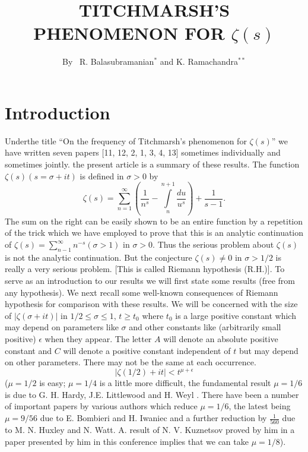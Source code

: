 
\title{TITCHMARSH'S PHENOMENON FOR $\zeta (s)$}

\author{By~ R. Balasubramanian$^\ast$ and K. Ramachandra$^{\ast\ast}$}

\date{}
\maketitle

\setcounter{pageoriginal}{12} 

\section{Introduction}\label{art2-sec1}
Under\pageoriginale  the title ``On the frequency of Titchmarsh's phenomenon for $\zeta(s)$'' we have written seven papers [11, 12, 2, 1, 3, 4, 13] sometimes individually and sometimes jointly. the present article is a summary of these results. The function $\zeta(s) (s = \sigma + it)$ is defined in $\sigma > 0$ by 
$$
\zeta(s) = \sum\limits^\infty_{n=1} \left(\frac{1}{n^s} - \int\limits^{n+1}_n \frac{du}{u^s} \right) + \frac{1}{s-1}. 
$$
The sum on the right can be easily shown to be an entire function by a repetition of the trick which we have employed to prove that this is an analytic continuation of $\zeta(s) = \sum\limits^\infty_{n-1} n^{-s} (\sigma >1)$ in $\sigma >0$. Thus the serious problem about $\zeta(s)$ is not the analytic continuation. But the conjecture $\zeta(s) \neq 0$ in $\sigma > 1/2$ is really a very serious problem. [This is called Riemann hypothesis (R.H.)]. To serve as an introduction to our results we will first state some results (free from any hypothesis). We next recall some well-known consequences of Riemann hypothesis for comparison with these results. We will be concerned with the size of $|\zeta(\sigma + it)|$ in $1/2 \leqslant \sigma \leqslant 1$, $t \geqslant t_0$ where $t_0$ is a large positive constant which may depend on parameters like $\sigma$ and other constants like (arbitrarily small positive) $\epsilon$ when they appear. The letter $A$ will denote an absolute positive constant and $C$ will denote a positive constant independent of $t$ but may depend on other parameters. There may not be the same at each occurrence. 
\begin{equation}
|\zeta(1/2) + it| < t^{\mu+ \epsilon} \label{art2-eq1}
\end{equation}
($\mu = 1/2$ is easy; $\mu = 1/4$ is a little more difficult, the fundamental result $\mu = 1/6$ is due to G. H. Hardy, J.E. Littlewood and H. Weyl \cite{art2-key19}. There have been a number of important papers by various authors which reduce $\mu =1/6$, the latest being $\mu = 9/56$ due to E. Bombieri and H. Iwaniec \cite{art2-key7} and a further reduction by $\frac{1}{560}$ due to M. N. Huxley and N. Watt. A. result of N. V. Kuznetsov proved by him in a paper presented by him in this conference implies that we can take $\mu = 1/8$).
